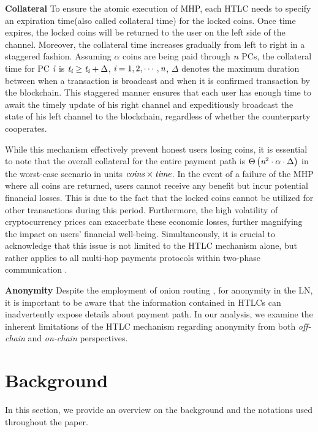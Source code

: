 \documentclass[conference]{IEEEtran}
\begin{document}
\textbf{Collateral} To ensure the atomic execution of MHP, each HTLC needs to specify an expiration time(also called 
collateral time) for the locked coins. Once time expires, the locked coins will be returned to the user on the left 
side of the channel. Moreover, the collateral time increases gradually from left to right in a staggered fashion. 
Assuming $\alpha$ coins are being paid through $\emph{n}$ PCs, the collateral time for PC $\emph{i}$ is $\emph{t}_{\emph{i}}\geq\emph{t}_{\emph{i}}+\Delta$, 
$\emph{i}=1,2,\cdots ,\emph{n}$, $\Delta$ denotes the maximum duration between when a transaction is broadcast and 
when it is confirmed transaction by the blockchain. This staggered manner ensures that each user has enough time to 
await the timely update of his right channel and expeditiously broadcast the state of his left channel to the blockchain, 
regardless of whether the counterparty cooperates. 

While this mechanism effectively prevent honest users losing coins, it is essential to note that the overall collateral 
for the entire payment path is $\Theta \left ( \emph{n}^{2}\cdot \alpha\cdot  \Delta  \right )$ in the worst-case 
scenario in units $ \emph{coins}\times \emph{time}$. In the event of a failure of the MHP where all coins are returned, 
users cannot receive any benefit but incur potential financial losses. This is due to the fact that the locked coins 
cannot be utilized for other transactions during this period. Furthermore, the high volatility of cryptocurrency 
prices can exacerbate these economic losses, further magnifying the impact on users' financial well-being. 
Simultaneously, it is crucial to acknowledge that this issue is not limited to the HTLC mechanism alone, 
but rather applies to all multi-hop payments protocols within two-phase communication \cite{blitz}. 

\textbf{Anonymity} Despite the employment of onion routing \cite{onion routing}, \cite{sphinx} for anonymity in 
the LN, it is important to be aware that the information contained in HTLCs can inadvertently expose details 
about payment path. In our analysis, we examine the inherent limitations of the HTLC mechanism regarding anonymity 
from both \textit{off-chain} and \textit{on-chain} perspectives. 

\section{Background}
In this section, we provide an overview on the background and the notations used throughout the paper.
\end{document}
